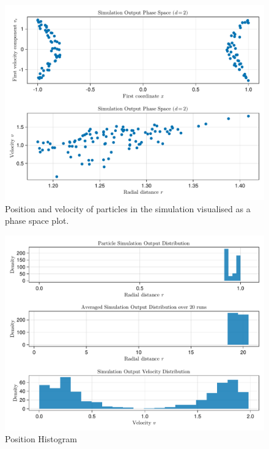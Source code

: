 \begin{figure}[H]
  \centering
  \label{fig:phase-space-plot}
  \includegraphics[width=0.8\linewidth]{../figures/results/phase-space-plot.pdf}
  \caption{Position and velocity of particles in the simulation visualised as a phase space plot.}
\end{figure}

\begin{figure}[H]
  \centering
  \label{fig:simulation-histogram}
  \includegraphics[width=0.8\linewidth]{../figures/results/simulation-histogram.pdf}
  \caption{Position Histogram}
\end{figure}
